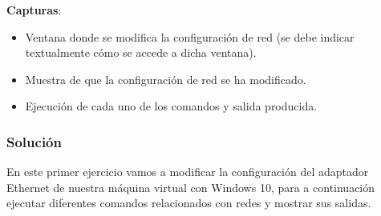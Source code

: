 \textbf{Capturas}:

\begin{itemize}
    \item Ventana donde se modifica la configuración de red (se debe indicar textualmente cómo se accede a dicha ventana).
    \item Muestra de que la configuración de red se ha modificado.
    \item Ejecución de cada uno de los comandos y salida producida.
\end{itemize}

\subsubsection{Solución}

En este primer ejercicio vamos a modificar la configuración del adaptador Ethernet de nuestra máquina virtual con Windows 10, para a continuación ejecutar diferentes comandos relacionados con redes y mostrar sus salidas.

